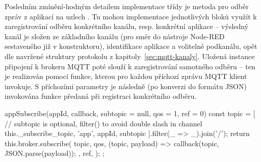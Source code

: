 Posledním zmínění-hodným detailem implementace třídy  je metoda pro odběr zpráv z aplikací na uzlech
.
Tu mohou implementace jednotlivých bloků využít k zaregistrování odběru konkrétního kanálu, resp. konkrétní aplikace
-- výsledný kanál je složen ze základního kanálu (pro směr do nástroje Node-RED sestaveného již v konstruktoru),
identifikace aplikace  a volitelně podkanálu, opět dle navržené struktury protokolu z kapitoly~\ref{sec:mqtt-kanaly}.
Uložená instance připojení k brokeru MQTT poté slouží k zaregistrování samotného odběru -- ten je realizován pomocí
funkce, kterou pro každou příchozí zprávu MQTT klient invokuje.
S příchozími parametry je následně (po konverzi do formátu JSON) invokována funkce předaná při registraci konkrétního
odběru.

\begin{code}[
    language=Javascript,
    label=code:fis-node-app-subscribe,
    caption={Detail z implementace třídy \ic{FisNode} -- metoda \ic{appSubscribe} je určená k zaregistrování odběru
    kanálu odpovídajícího konkrétní aplikaci na konkrétním uzlu.
    Parametr \ic{qos} slouží k nastavení konkrétní QoS pro tento odběr, \ic{ref} je poté volitelná identifikace odběru,
    lze pomocí ní poté mazat konkrétní odběry.}
]
appSubscribe(appId, callback, subtopic = null, qos = 1, ref = 0) {
    const topic = [
        // subtopic is optional, filter() to avoid double slash in channel
        this._subscribe_topic, 'app', appId, subtopic
    ].filter(_ => _).join('/');
    return this.broker.subscribe(
        topic,
        qos,
        (topic, payload) => {
            callback(topic, JSON.parse(payload));
        },
        ref,
    );
};
\end{code}

